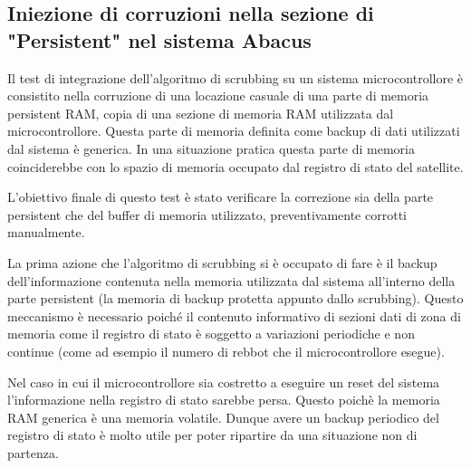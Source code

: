 \documentclass[LaM,binding=0.6cm]{../sapthesis}
\begin{document}
\subsection{Iniezione di corruzioni nella sezione di "Persistent" nel sistema Abacus}

Il test di integrazione dell'algoritmo di scrubbing su un sistema microcontrollore è consistito nella corruzione di una locazione casuale di una parte di memoria persistent RAM, copia di una sezione di memoria RAM utilizzata dal microcontrollore. 
Questa parte di memoria definita come backup di dati utilizzati dal sistema è generica. In una situazione pratica questa parte di memoria coinciderebbe con lo spazio di memoria occupato dal registro di stato del satellite.

L'obiettivo finale di questo test è stato verificare la correzione sia della parte persistent che del buffer di memoria utilizzato, preventivamente corrotti manualmente.

La prima azione che l'algoritmo di scrubbing si è occupato di fare è il backup dell'informazione contenuta nella memoria utilizzata dal sistema all'interno della parte persistent (la memoria di backup protetta appunto dallo scrubbing). Questo meccanismo è necessario poiché il contenuto informativo di sezioni dati di zona di memoria come il registro di stato è soggetto a variazioni periodiche e non continue (come ad esempio il numero di rebbot che il microcontrollore esegue). 

Nel caso in cui il microcontrollore sia costretto a eseguire un reset del sistema l'informazione nella registro di stato sarebbe persa. Questo poichè la memoria RAM generica è una memoria volatile. Dunque avere un backup periodico del registro di stato è molto utile per poter ripartire da una situazione non di partenza.
\end{document}
